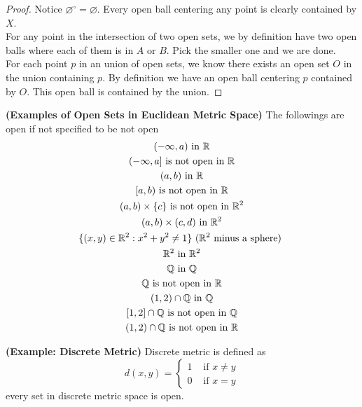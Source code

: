 \documentclass{report}
\begin{document}
\begin{proof}
Notice $\varnothing^\circ =\varnothing$. Every open ball centering any point is clearly contained by $X$.\\

For any point in the intersection of two open sets, we by definition have two open balls where each of them is in $A$ or $B$. Pick the smaller one and we are done.\\

For each point $p$ in an union of open sets, we know there exists an open set $O$ in the union containing $p$. By definition we have an open ball centering  $p$ contained by  $O$. This open ball is contained by the union.
\end{proof}
\begin{theorem}
\label{2.3.9}
\textbf{(Examples of Open Sets in Euclidean Metric Space)} The followings are open if not specified to be not open
\begin{gather}
   (-\infty , a)\text{ in }\R\\
   (-\infty,a]\text{ is not open in }\R\\
   (a,b)\text{ in }\R\\
   [a,b)\text{ is not open in }\R\\
   (a,b)\times \set{c}\text{ is not open in  }\R^2\\
   (a,b)\times (c,d)\text{ in }\R^2\\
   \set{(x,y)\inr^2: x^2+y^2\neq 1}\text{ ($\R^2$ minus a sphere) }\\
      \R^2 \text{ in } \R^2\\ 
      \Q\text{ in }\Q\\
      \Q\text{ is not open in }\R\\
      (1,2)\cap \Q\text{ in }\Q\\
      [1,2]\cap \Q\text{ is not open in }\Q\\
      (1,2)\cap \Q\text{ is not open in }\R
\end{gather}
\end{theorem}
\begin{theorem}
\label{2.3.10}
\textbf{(Example: Discrete Metric)} Discrete metric is defined as
\begin{equation}
d(x,y)=\begin{cases}
  1& \text{ if  }x\neq y\\
  0& \text{ if  }x=y
\end{cases}
\end{equation}
every set in discrete metric space is open.
\end{theorem}
\end{document}
